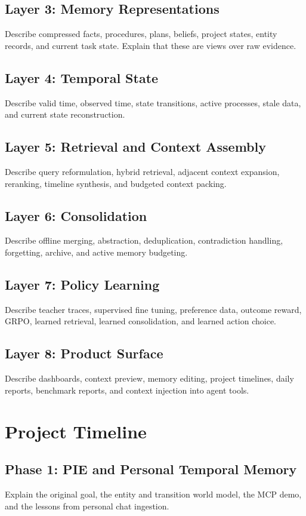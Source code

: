 \documentclass[11pt]{article}
\begin{document}
\subsection{Layer 3: Memory Representations}
Describe compressed facts, procedures, plans, beliefs, project states, entity records, and current task state. Explain that these are views over raw evidence.

\subsection{Layer 4: Temporal State}
Describe valid time, observed time, state transitions, active processes, stale data, and current state reconstruction.

\subsection{Layer 5: Retrieval and Context Assembly}
Describe query reformulation, hybrid retrieval, adjacent context expansion, reranking, timeline synthesis, and budgeted context packing.

\subsection{Layer 6: Consolidation}
Describe offline merging, abstraction, deduplication, contradiction handling, forgetting, archive, and active memory budgeting.

\subsection{Layer 7: Policy Learning}
Describe teacher traces, supervised fine tuning, preference data, outcome reward, GRPO, learned retrieval, learned consolidation, and learned action choice.

\subsection{Layer 8: Product Surface}
Describe dashboards, context preview, memory editing, project timelines, daily reports, benchmark reports, and context injection into agent tools.

\section{Project Timeline}

\subsection{Phase 1: PIE and Personal Temporal Memory}
Explain the original goal, the entity and transition world model, the MCP demo, and the lessons from personal chat ingestion.
\end{document}
